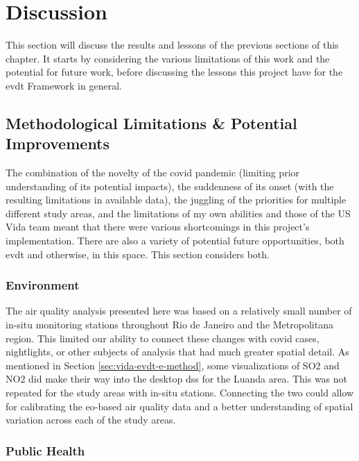 \newpage

\section{Discussion} \label{sec:vida-discuss}

This section will discuss the results and lessons of the previous sections of this chapter. It starts by considering the various limitations of this work and the potential for future work, before discussing the lessons this project have for the \ac{evdt} Framework in general.

\subsection{Methodological Limitations \& Potential Improvements}

The combination of the novelty of the \ac{covid} pandemic (limiting prior understanding of its potential impacts), the suddenness of its onset (with the resulting limitations in available data), the juggling of the priorities for multiple different study areas, and the limitations of my own abilities and those of the US Vida team meant that there were various shortcomings in this project's implementation. There are also a variety of potential future opportunities, both \ac{evdt} and otherwise, in this space. This section considers both.

\subsubsection{Environment}

The air quality analysis presented here was based on a relatively small number of in-situ monitoring stations throughout Rio de Janeiro and the Metropolitana region. This limited our ability to connect these changes with \ac{covid} cases, nightlights, or other subjects of analysis that had much greater spatial detail. As mentioned in Section \ref{sec:vida-evdt-e-method}, some visualizations of SO2 and NO2 did make their way into the desktop \ac{dss} for the Luanda area. This was not repeated for the study areas with in-situ stations. Connecting the two could allow for calibrating the \ac{eo}-based air quality data and a better understanding of spatial variation across each of the study areas.

\subsubsection{Public Health}

